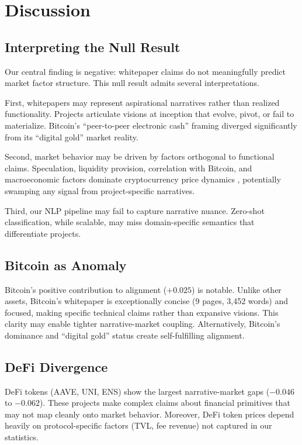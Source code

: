 \documentclass[11pt,twocolumn]{article}
\begin{document}
\section{Discussion}
\label{sec:discussion}

\subsection{Interpreting the Null Result}

Our central finding is negative: whitepaper claims do not meaningfully predict market factor structure. This null result admits several interpretations.

First, whitepapers may represent aspirational narratives rather than realized functionality. Projects articulate visions at inception that evolve, pivot, or fail to materialize. Bitcoin's ``peer-to-peer electronic cash'' framing diverged significantly from its ``digital gold'' market reality.

Second, market behavior may be driven by factors orthogonal to functional claims. Speculation, liquidity provision, correlation with Bitcoin, and macroeconomic factors dominate cryptocurrency price dynamics \citep{liu2021risks}, potentially swamping any signal from project-specific narratives.

Third, our NLP pipeline may fail to capture narrative nuance. Zero-shot classification, while scalable, may miss domain-specific semantics that differentiate projects.

\subsection{Bitcoin as Anomaly}

Bitcoin's positive contribution to alignment ($+0.025$) is notable. Unlike other assets, Bitcoin's whitepaper is exceptionally concise (9 pages, 3,452 words) and focused, making specific technical claims rather than expansive visions. This clarity may enable tighter narrative-market coupling. Alternatively, Bitcoin's dominance and ``digital gold'' status create self-fulfilling alignment.

\subsection{DeFi Divergence}

DeFi tokens (AAVE, UNI, ENS) show the largest narrative-market gaps ($-0.046$ to $-0.062$). These projects make complex claims about financial primitives that may not map cleanly onto market behavior. Moreover, DeFi token prices depend heavily on protocol-specific factors (TVL, fee revenue) not captured in our statistics.
\end{document}
